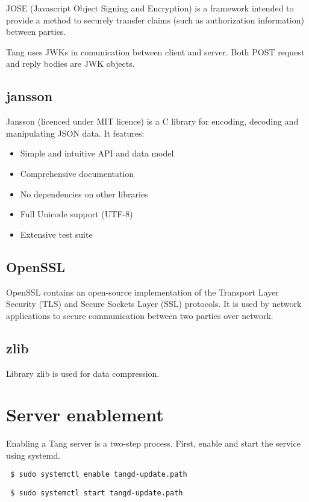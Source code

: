 \documentclass[../xdudla00-porting-Tang-to-Open-WRT.tex]{subfiles}
\begin{document}
JOSE (Javascript Object Signing and Encryption) is a framework intended to provide a method to securely transfer claims (such as authorization information) between parties.

Tang uses JWKs in comunication between client and server. Both POST request and reply bodies are JWK objects.

\subsection{jansson}\label{jansson}
Jansson \cite{jansson}(licenced under MIT \cite{mit} licence) is a C library for encoding, decoding and manipulating JSON data. It features:
\begin{itemize}

    \item Simple and intuitive API and data model
    \item Comprehensive documentation
    \item No dependencies on other libraries
    \item Full Unicode support (UTF-8)
    \item Extensive test suite
\end{itemize}

\subsection{OpenSSL}\label{openssl}
OpenSSL \cite{openssl} contains an open-source implementation of the Transport Layer Security (TLS) and Secure Sockets Layer (SSL) protocols.
It is used by network applications to secure communication between two parties over network.

\subsection{zlib}\label{zlib}
Library zlib \cite{zlib} is used for data compression.

\section{Server enablement}
Enabling a Tang server is a two-step process.
First, enable and start the service using systemd.

{\tt\begin{verbatim} $ sudo systemctl enable tangd-update.path\end{verbatim}
}

{\tt\begin{verbatim} $ sudo systemctl start tangd-update.path\end{verbatim}
}
\end{document}
